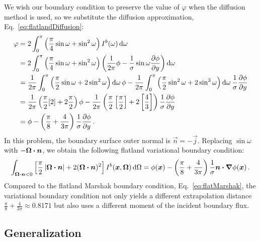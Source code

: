 We wish our boundary condition to preserve the value of
$\varphi$ when the diffusion method is used, so we substitute the diffusion
approximation, Eq.~\eqref{eq:flatlandDiffusion}:
\begin{align*}
 \varphi &= 2\int_{0}^{\pi} \left( \frac{\pi}{4} \sin\omega + \sin^2\omega \right)
 I^b(\omega) \mathop{}\!\mathrm{d}\omega
 \\
 &= 
  2\int_{0}^{\pi} \left( \frac{\pi}{4} \sin\omega + \sin^2\omega \right)
 \left( \frac{1}{2\pi} \phi -
  \frac{1}{\sigma} \sin\omega \frac{\partial \phi}{\partial y}\right)\mathop{}\!\mathrm{d}\omega
\\
 &= 
\frac{1}{2\pi} \int_{0}^{\pi} \left( \frac{\pi}{2} \sin\omega + 2 \sin^2\omega
\right)\mathop{}\!\mathrm{d}\omega
 \,\phi -
 \frac{1}{2\pi} \int_{0}^{\pi} \left( \frac{\pi}{2} \sin^2\omega + 2 \sin^3\omega \right)\mathop{}\!\mathrm{d}\omega
  \,\frac{1}{\sigma} \frac{\partial \phi}{\partial y}
  \\
 &= 
 \frac{1}{2\pi} \left( \frac{\pi}{2} [2] + 2 \frac{\pi}{2}
\right) \phi
-
\frac{1}{2\pi} \left( \frac{\pi}{2} \left[ \frac{\pi}{2} \right] + 2 \left[
\frac{4}{3} \right] \right) \frac{1}{\sigma} \frac{\partial \phi}{\partial y}
\\
 &= 
  \phi
- \left( \frac{\pi}{8} + \frac{4}{3\pi} \right) \frac{1}{\sigma} \frac{\partial \phi}{\partial y}
\,.
\end{align*}
In this problem, the boundary surface outer normal is $\vec{n}=-\vec{j}$. 
Replacing $\sin \omega$ with $-\bm{\Omega}\bm{\cdot}\bm{n}$, we obtain the following
flatland variational boundary condition:
\begin{equation} \label{eq:flatVarBc}
\int_{\bm{\Omega}\bm{\cdot}\bm{n} < 0} \left[ \frac{\pi}{2}
\left| \bm{\Omega}\bm{\cdot}\bm{n} \right| + 2 (\bm{\Omega}\bm{\cdot}\bm{n})^2 \right]
I^b(\bm{x}, \bm{\Omega}) \mathop{}\!\mathrm{d}\Omega
= 
  \phi(\bm{x})
  - \left( \frac{\pi}{8} + \frac{4}{3\pi} \right) \frac{1}{\sigma}
  \bm{n}\bm{\cdot}\bm{\nabla} \phi(\bm{x})\,.
\end{equation}
Compared to the flatland Marshak boundary condition,
Eq.~\eqref{eq:flatMarshak}, the variational boundary condition not only yields a
different extrapolation distance $\frac{\pi}{8} + \frac{4}{3\pi} \approx
0.8171$ but also uses a different moment of the incident boundary flux.

\subsection{Generalization}\label{sec:flatlandV}

